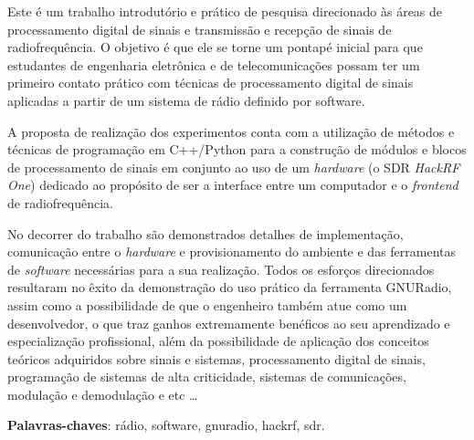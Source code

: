 \documentclass[
  12pt,				%
  openright,			%
  twoside,			%
  a4paper,			%
  english,			%
  french,				%
  spanish,			%
  brazil,				%
  ]{abntex2}
\begin{document}

\setlength{\absparsep}{18pt} %
\begin{resumo}

  Este é um trabalho introdutório e prático de pesquisa direcionado às áreas de processamento digital de sinais e transmissão e recepção de sinais de radiofrequência.
  O objetivo é que ele se torne um pontapé inicial para que estudantes de engenharia eletrônica e de telecomunicações possam ter um primeiro contato prático com
  técnicas de processamento digital de sinais aplicadas a partir de um sistema de rádio definido por software.

  A proposta de realização dos experimentos conta com a  utilização de métodos e técnicas de programação em C++/Python para a construção de módulos e blocos de processamento
  de sinais em conjunto ao uso de um \textit{hardware} (o SDR \textit{HackRF One}) dedicado ao propósito de ser a interface entre um computador e o \textit{frontend} de radiofrequência.

  No decorrer do trabalho são demonstrados detalhes de implementação, comunicação entre o \textit{hardware} e provisionamento do ambiente e das ferramentas de
  \textit{software} necessárias para a sua realização. Todos os esforços direcionados resultaram no êxito da demonstração do uso prático da ferramenta GNURadio, assim como
  a possibilidade de que o engenheiro também atue como um desenvolvedor, o que traz ganhos extremamente benéficos ao seu aprendizado e especialização profissional, além da
  possibilidade de aplicação dos conceitos teóricos adquiridos sobre sinais e sistemas, processamento digital de sinais, programação de sistemas de alta criticidade, sistemas
  de comunicações, modulação e demodulação e etc \ldots

  \noindent
  \textbf{Palavras-chaves}: rádio, software, gnuradio, hackrf, sdr.
\end{resumo}

\end{document}
